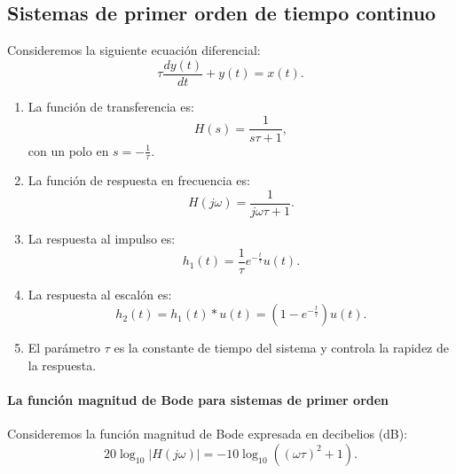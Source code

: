 \subsection{Sistemas de primer orden de tiempo continuo}

Consideremos la siguiente ecuaci\'{o}n diferencial:
\begin{equation}
	\tau \frac{dy(t)}{dt} + y(t) = x(t).
\end{equation}

\begin{enumerate}
	\item La funci\'{o}n de transferencia es:
	\begin{equation}
		H(s) = \frac{1}{s\tau + 1},
	\end{equation}
	con un polo en $s = -\frac{1}{\tau}$.
	
	\item La funci\'{o}n de respuesta en frecuencia es:
	\begin{equation}
		H(j\omega) = \frac{1}{j\omega \tau + 1}.
	\end{equation}
	
	\item La respuesta al impulso es:
	\begin{equation}
		h_{1}(t) = \frac{1}{\tau} e^{-\frac{t}{\tau}} u(t).
	\end{equation}
	
	\item La respuesta al escal\'{o}n es:
	\begin{equation}
		h_{2}(t) = h_{1}(t) * u(t) = \left(1 - e^{-\frac{t}{\tau}}\right) u(t).
	\end{equation}
	
	\item El par\'{a}metro $\tau$ es la constante de tiempo del sistema y controla la rapidez de la respuesta.
\end{enumerate}

\paragraph{La funci\'{o}n magnitud de Bode para sistemas de primer orden}
Consideremos la funci\'{o}n magnitud de Bode expresada en decibelios (dB):
\begin{equation}
	20\log_{10} |H(j\omega)| = -10\log_{10}\left((\omega\tau)^{2} + 1\right). \label{magbode}
\end{equation}

